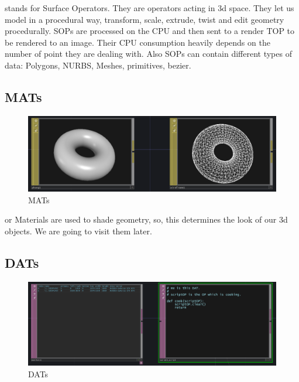 \SOPs stands for Surface Operators. They are operators acting in 3d space. They let us model in a procedural way, transform, scale, extrude, twist and edit geometry procedurally. SOPs are processed on the CPU and then sent to a render TOP to be rendered to an image. Their CPU consumption heavily depends on the number of point they are dealing with. Also SOPs can contain different types of data: Polygons, NURBS, Meshes, primitives, bezier.

\subsection{MATs} %
\label{sub:mats}

\begin{figure}[H]
	\begin{center}
		\includegraphics[width = 14cm]{img/mats.png}
		\caption{MATs}
		\label{fig:mats}
	\end{center}
\end{figure}
\MATs or Materials are used to shade geometry, so, this determines the look of our 3d objects. We are going to visit them later.

\subsection{DATs} %
\label{sub:dats}


\begin{figure}[H]
	\begin{center}
		\includegraphics[width = 14cm]{img/dats.png}
		\caption{DATs}
		\label{fig:dats}
	\end{center}
\end{figure}

